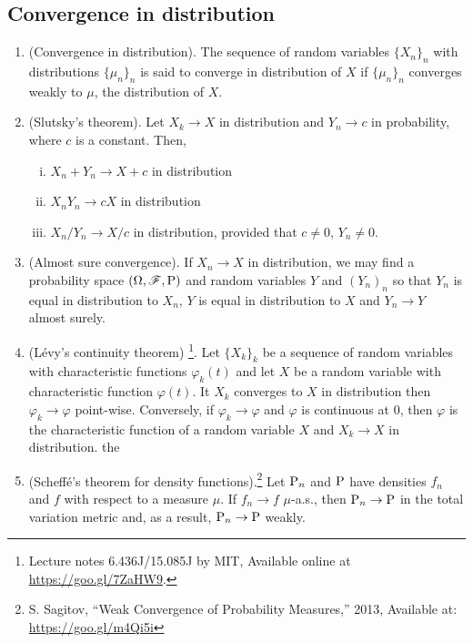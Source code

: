 \documentclass[a4paper,10pt]{article}
\begin{document}
\subsection{Convergence in distribution}
\begin{enumerate}
\item (Convergence in distribution). The sequence of random variables $\{X_n\}_n$ with distributions 
      $\{\mu_n\}_n$ is said to converge in distribution of $X$ if $\{\mu_n\}_n$ converges weakly
      to $\mu$, the distribution of $X$.
      
\item (Slutsky's theorem). Let $X_k\to X$ in distribution and $Y_n\to c$ in probability, where $c$ is a constant.
      Then, 
      \begin{enumerate}[i.]
       \item $X_n + Y_n \to X + c$ in distribution
       \item $X_nY_n \to cX$ in distribution
       \item $X_n/Y_n \to X/c$ in distribution, provided that $c\neq 0$, $Y_n\neq 0$.
      \end{enumerate}
      
\item (Almost sure convergence). If $X_n\to X$ in distribution, we may find a probability space $(\Omega,\mathscr{F},\mathrm{P})$
      and random variables $Y$ and $(Y_n)_n$ so that $Y_n$ is equal in distribution to $X_n$,
      $Y$ is equal in distribution to $X$ and $Y_n\to Y$ almost surely.
      
\item (L{\'e}vy's continuity theorem)%
	  \footnote{Lecture notes 6.436J/15.085J by MIT, Available online at \url{https://goo.gl/7ZaHW9}.}. 
      Let $\{X_k\}_k$ be a sequence of random variables with characteristic functions $\varphi_k(t)$ and let $X$ be a random variable with characteristic function $\varphi(t)$. It $X_k$ converges to $X$ in distribution then $\varphi_k \to \varphi$ point-wise. Conversely, if $\varphi_k \to \varphi$ and $\varphi$ is continuous at $0$, then $\varphi$ is the characteristic function of a random variable $X$ and $X_k\to X$ in distribution.
      the 
\item (Scheff\'e's theorem for density functions).\footnote{S. Sagitov, ``Weak Convergence of Probability Measures,'' 2013, Available at: \url{https://goo.gl/m4Qi5i}}
Let $\mathrm{P}_n$ and $\mathrm{P}$ have densities $f_n$ and $f$
      with respect to a measure $\mu$. If $f_n \to f$ $\mu$-a.s., then $\mathrm{P}_n \to \mathrm{P}$ in the total 
      variation metric and, as a result,  $\mathrm{P}_n \to \mathrm{P}$ weakly.
      

\end{enumerate}
\end{document}
